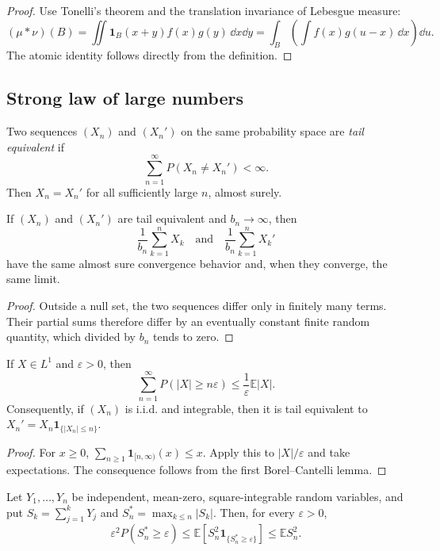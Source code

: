 \begin{proof}
Use Tonelli's theorem and the translation invariance of Lebesgue measure:
\[
(\mu*\nu)(B)
 =\iint\mathbf1_B(x+y)f(x)g(y)\,\dd x\dd y
 =\int_B\!\left(\int f(x)g(u-x)\,\dd x\right)\dd u.
\]
The atomic identity follows directly from the definition.
\end{proof}

\subsection{Strong law of large numbers}

\begin{de}
Two sequences $(X_n)$ and $(X_n')$ on the same probability space are
\emph{tail equivalent} if
\[
\sum_{n=1}^{\infty}P(X_n\neq X_n')<\infty.
\]
Then $X_n=X_n'$ for all sufficiently large $n$, almost surely.
\end{de}

\begin{cor}
If $(X_n)$ and $(X_n')$ are tail equivalent and $b_n\to\infty$, then
\[
\frac1{b_n}\sum_{k=1}^{n}X_k
\quad\text{and}\quad
\frac1{b_n}\sum_{k=1}^{n}X_k'
\]
have the same almost sure convergence behavior and, when they converge, the
same limit.
\end{cor}

\begin{proof}
Outside a null set, the two sequences differ only in finitely many terms.
Their partial sums therefore differ by an eventually constant finite random
quantity, which divided by $b_n$ tends to zero.
\end{proof}

\begin{lem}
If $X\in L^1$ and $\varepsilon>0$, then
\[
\sum_{n=1}^{\infty}P(|X|\geq n\varepsilon)
 \leq\frac1\varepsilon\mathbb E|X|.
\]
Consequently, if $(X_n)$ is i.i.d. and integrable, then it is tail equivalent
to
$X_n'=X_n\mathbf1_{\{|X_n|\leq n\}}$.
\end{lem}

\begin{proof}
For $x\geq0$,
$\sum_{n\ge1}\mathbf1_{[n,\infty)}(x)\leq x$. Apply this to
$|X|/\varepsilon$ and take expectations. The consequence follows from the
first Borel--Cantelli lemma.
\end{proof}

\begin{thm}
Let $Y_1,\ldots,Y_n$ be independent, mean-zero, square-integrable random
variables, and put $S_k=\sum_{j=1}^{k}Y_j$ and
$S_n^*=\max_{k\leq n}|S_k|$. Then, for every $\varepsilon>0$,
\[
\varepsilon^2P(S_n^*\geq\varepsilon)
 \leq\mathbb E[S_n^2\mathbf1_{\{S_n^*\geq\varepsilon\}}]
 \leq\mathbb E S_n^2.
\]
\end{thm}

